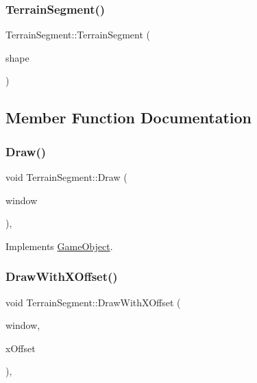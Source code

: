 \subsubsection{\texorpdfstring{Terrain\+Segment()}{TerrainSegment()}}
{\footnotesize\ttfamily Terrain\+Segment\+::\+Terrain\+Segment (\begin{DoxyParamCaption}\item[{sf\+::\+Convex\+Shape}]{shape }\end{DoxyParamCaption})}



\subsection{Member Function Documentation}
\hypertarget{class_terrain_segment_a288c66908f5eaf7974424f64a95d9a9a}{}\label{class_terrain_segment_a288c66908f5eaf7974424f64a95d9a9a} 
\subsubsection{\texorpdfstring{Draw()}{Draw()}}
{\footnotesize\ttfamily void Terrain\+Segment\+::\+Draw (\begin{DoxyParamCaption}\item[{sf\+::\+Render\+Window \&}]{window }\end{DoxyParamCaption})\hspace{0.3cm}{\ttfamily [override]}, {\ttfamily [virtual]}}



Implements \hyperlink{class_game_object_a0bd45eb831b3d0959eb498cad3e412ce}{Game\+Object}.

\hypertarget{class_terrain_segment_ad9832f83e328b50f647bb844846fb095}{}\label{class_terrain_segment_ad9832f83e328b50f647bb844846fb095} 
\subsubsection{\texorpdfstring{Draw\+With\+X\+Offset()}{DrawWithXOffset()}}
{\footnotesize\ttfamily void Terrain\+Segment\+::\+Draw\+With\+X\+Offset (\begin{DoxyParamCaption}\item[{sf\+::\+Render\+Window \&}]{window,  }\item[{float}]{x\+Offset }\end{DoxyParamCaption})\hspace{0.3cm}{\ttfamily [override]}, {\ttfamily [virtual]}}



